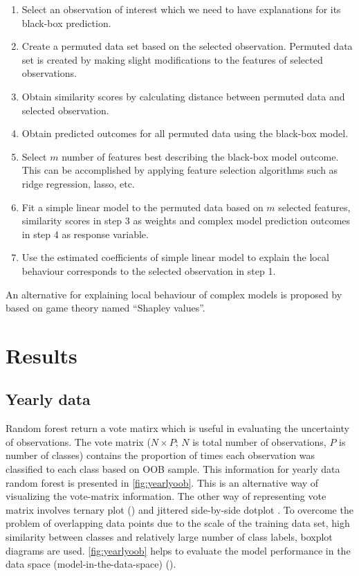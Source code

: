 \documentclass[11pt,a4paper,]{article}
\providecommand{\tightlist}{%
  \setlength{\itemsep}{0pt}\setlength{\parskip}{0pt}}
\begin{document}
\begin{enumerate}
\def\labelenumi{\arabic{enumi}.}
\tightlist
\item
  Select an observation of interest which we need to have explanations
  for its black-box prediction.
\item
  Create a permuted data set based on the selected observation. Permuted
  data set is created by making slight modifications to the features of
  selected observations.
\item
  Obtain similarity scores by calculating distance between permuted data
  and selected observation.
\item
  Obtain predicted outcomes for all permuted data using the black-box
  model.
\item
  Select \(m\) number of features best describing the black-box model
  outcome. This can be accomplished by applying feature selection
  algorithms such as ridge regression, lasso, etc.
\item
  Fit a simple linear model to the permuted data based on \(m\) selected
  features, similarity scores in step 3 as weights and complex model
  prediction outcomes in step 4 as response variable.
\item
  Use the estimated coefficients of simple linear model to explain the
  local behaviour corresponds to the selected observation in step 1.
\end{enumerate}

An alternative for explaining local behaviour of complex models is
proposed by \textcite{lundberg2017unified} based on game theory named
``Shapley values''.

\section{Results}\label{results}

\subsection{Yearly data}\label{yearly-data}

Random forest return a vote matirx which is useful in evaluating the
uncertainty of observations. The vote matrix (\(N \times P\); \(N\) is
total number of observations, \(P\) is number of classes) contains the
proportion of times each observation was classified to each class based
on OOB sample. This information for yearly data random forest is
presented in \autoref{fig:yearlyoob}. This is an alternative way of
visualizing the vote-matrix information. The other way of representing
vote matrix involves ternary plot (\textcite{sutherland2000orca}) and
jittered side-by-side dotplot
\autocites{ehrlinger2015ggrandomforests}{da2017interactive}. To overcome
the problem of overlapping data points due to the scale of the training
data set, high similarity between classes and relatively large number of
class labels, boxplot diagrams are used. \autoref{fig:yearlyoob} helps
to evaluate the model performance in the data space
(model-in-the-data-space) (\textcite{da2017interactive}).
\end{document}
